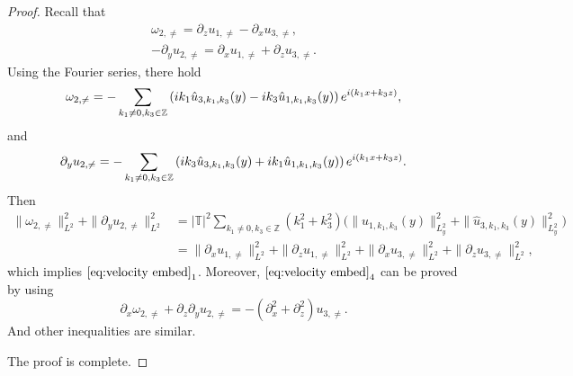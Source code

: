 \documentclass[12pt, reqno]{amsart}
\numberwithin{equation}{section}
\begin{document}
	\begin{proof}
		Recall that
		\begin{equation}\label{velocity1}
			\begin{aligned}
				\omega_{2,\neq}=\partial_zu_{1,\neq}-\partial_xu_{3,\neq},\\
				-\partial_y u_{2,\neq}=\partial_x u_{1,\neq}+\partial_z u_{3,\neq}.
			\end{aligned}
		\end{equation}
		Using the Fourier series, there hold
		\begin{equation*}
			\begin{aligned}
				\omega_{2,\neq}=-\sum_{k_1\neq0,k_3\in\mathbb{Z}}
				\left(ik_1\hat{u}_{3,k_1,k_3}(y)-ik_3\hat{u}_{1,k_1,k_3}(y)\right)
				{\rm e}^{i(k_1x+k_3z)},
			\end{aligned}
		\end{equation*}
		and 
		\begin{equation*}
			\begin{aligned}
				\partial_yu_{2,\neq}=-\sum_{k_1\neq0,k_3\in\mathbb{Z}}
				\left(ik_3\hat{u}_{3,k_1,k_3}(y)+ik_1\hat{u}_{1,k_1,k_3}(y)\right)
				{\rm e}^{i(k_1x+k_3z)}.
			\end{aligned}
		\end{equation*}
		Then
		\begin{equation*}
			\begin{aligned}
				\|\omega_{2,\neq}\|^2_{L^2}+\|\partial_yu_{2,\neq}\|^2_{L^2}&=|\mathbb{T}|^2
				\sum_{k_1\neq0,k_3\in\mathbb{Z}}\left(k_1^2+k_3^2\right)
				\Big(\|\hat{u}_{1,k_1,k_3}(y)\|_{L^2_y}^2+\|\hat{u}_{3,k_1,k_3}(y)\|^2_{L^2_y}\Big)\\
				&=\|\partial_xu_{1,\neq}\|^2_{L^2}+\|\partial_zu_{1,\neq}\|^2_{L^2}
				+\|\partial_xu_{3,\neq}\|^2_{L^2}+\|\partial_zu_{3,\neq}\|^2_{L^2},
			\end{aligned}
		\end{equation*}
		which implies $\eqref{eq:velocity embed}_1$. Moreover, $\eqref{eq:velocity embed}_4$ can be proved by using $$\partial_x\omega_{2,\neq}+\partial_z\partial_yu_{2,\neq}=-(\partial_x^2+\partial_z^2)u_{3,\neq}.$$
		And other inequalities are similar.
		
		The proof is complete.
	\end{proof}
	
\end{document}
